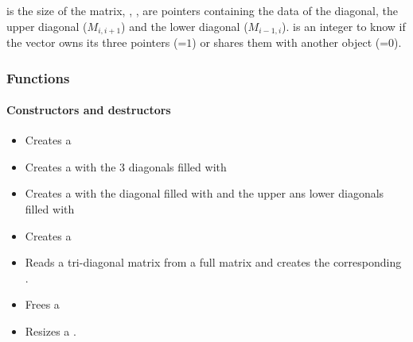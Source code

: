  is the size of the matrix, , ,
 are pointers containing the data of the diagonal, the upper
diagonal ($M_{i, i+1}$) and the lower diagonal ($M_{i-1, i}$).   is
an integer to know if the vector owns its three  pointers
(=$1$) or shares them with another object (=$0$).

\subsubsection{Functions}
\paragraph{Constructors and destructors}
\begin{itemize}
\item 
  \sshortdescribe Creates a 
\item {}
  \sshortdescribe Creates a  with the 3 diagonals
  filled with 
\item {}
  \sshortdescribe Creates a   with the diagonal
  filled with  and the upper ans lower diagonals filled with 
\item {}
  \sshortdescribe Creates a   
\item {}
  \sshortdescribe Reads a tri-diagonal matrix from a full matrix and creates
  the corresponding .
\item {}
  \sshortdescribe Frees a   
\item {}
  \sshortdescribe Resizes a .  
\end{itemize}

